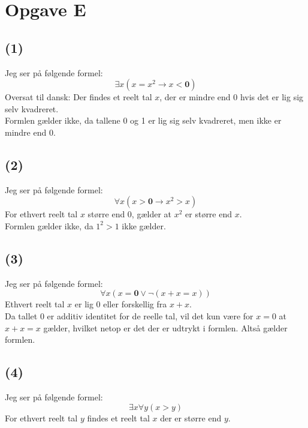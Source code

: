 \section*{Opgave E}

\subsection*{(1)}
Jeg ser på følgende formel:
\begin{equation}
  \exists x \left( x = x^2 \rightarrow x < \boldsymbol{0} \right)
\end{equation}
Oversat til dansk: Der findes et reelt tal $x$, der er mindre end 0 hvis det er lig sig selv kvadreret.\\

\noindent
Formlen gælder ikke, da tallene 0 og 1 er lig sig selv kvadreret, men ikke er mindre end 0.

\subsection*{(2)}
Jeg ser på følgende formel:
\begin{equation}
  \forall x \left( x > \boldsymbol{0} \rightarrow x^2 > x \right)
\end{equation}
For ethvert reelt tal $x$ større end 0, gælder at $x^2$ er større end $x$.\\

\noindent
Formlen gælder ikke, da $1^2>1$ ikke gælder.

\subsection*{(3)}
Jeg ser på følgende formel:
\begin{equation}
  \forall x \left( x = \boldsymbol{0} \lor \lnot \left( x + x = x \right) \right)
\end{equation}
Ethvert reelt tal $x$ er lig 0 eller forskellig fra $x+x$.\\

\noindent
Da tallet 0 er additiv identitet for de reelle tal, vil det kun være for $x=0$ at $x+x=x$ gælder, hvilket netop er det der er udtrykt i formlen. Altså gælder formlen.

\subsection*{(4)}
Jeg ser på følgende formel:
\begin{equation}
  \exists x \forall y \left( x > y \right)
\end{equation}
For ethvert reelt tal $y$ findes et reelt tal $x$ der er større end $y$.\\

